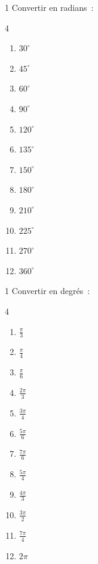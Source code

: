 \begin{exo}{1}
Convertir en radians~:
\begin{multicols}{4}
\begin{enumerate}
  \item $30^{\circ}$
  \item $45^{\circ}$
  \item $60^{\circ}$
  \item $90^{\circ}$
  \item $120^{\circ}$
  \item $135^{\circ}$
  \item $150^{\circ}$
  \item $180^{\circ}$
  \item $210^{\circ}$
  \item $225^{\circ}$
  \item $270^{\circ}$
  \item $360^{\circ}$
\end{enumerate}
\end{multicols}
\end{exo}

\begin{exo}{1}
Convertir en degr\'es~:
\begin{multicols}{4}
\begin{enumerate}
  \item $\frac{\pi}{3}$
  \item $\frac{\pi}{4}$
  \item $\frac{\pi}{6}$
  \item $\frac{2\pi}{3}$
  \item $\frac{3\pi}{4}$
  \item $\frac{5\pi}{6}$
  \item $\frac{7\pi}{6}$
  \item $\frac{5\pi}{4}$
  \item $\frac{4\pi}{3}$
  \item $\frac{3\pi}{2}$
  \item $\frac{7\pi}{4}$
  \item $2\pi$
\end{enumerate}
\end{multicols}
\end{exo}

